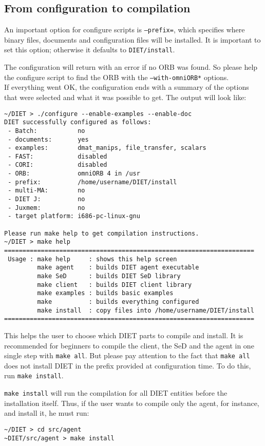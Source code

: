 \subsection{From configuration to compilation}

An important option for configure scripts is \texttt{--prefix=}, which
specifies where binary files, documents and configuration files will
be installed. It is important to set this option; otherwise it 
defaults to \texttt{DIET/install}.

The configuration will return with an error if no ORB was found. So
please help the configure script to find the ORB with the
\texttt{--with-omniORB*} options.\\


If everything went OK, the configuration ends with a summary of the
options that were selected and what it was possible to get. The output
will look like: {\footnotesize
\begin{verbatim}
~/DIET > ./configure --enable-examples --enable-doc
DIET successfully configured as follows:
 - Batch:           no
 - documents:       yes
 - examples:        dmat_manips, file_transfer, scalars
 - FAST:            disabled
 - CORI:            disabled
 - ORB:             omniORB 4 in /usr
 - prefix:          /home/username/DIET/install
 - multi-MA:        no
 - DIET J:          no
 - Juxmem:          no
 - target platform: i686-pc-linux-gnu
 
Please run make help to get compilation instructions.
~/DIET > make help
====================================================================
 Usage : make help     : shows this help screen
         make agent    : builds DIET agent executable
         make SeD      : builds DIET SeD library
         make client   : builds DIET client library
         make examples : builds basic examples
         make          : builds everything configured
         make install  : copy files into /home/username/DIET/install
====================================================================
\end{verbatim}
}

This helps the user to choose which DIET parts to compile and
install. It is recommended for beginners to compile the client,
the SeD and the agent in one single step with \texttt{make all}. But
please pay attention to the fact that \texttt{make all} does not
install DIET in the prefix provided at configuration time. To do this,
run \texttt{make install}.

\texttt{make install} will run the compilation for all DIET entities
before the installation itself. Thus, if the user wants to compile
only the agent, for instance, and install it, he must run:
{\footnotesize
\begin{verbatim}
~/DIET > cd src/agent
~DIET/src/agent > make install
\end{verbatim}
}


